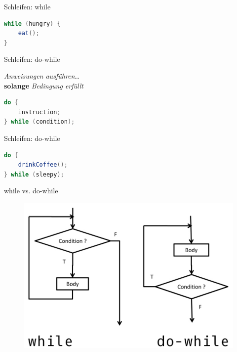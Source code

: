 \documentclass[18pt]{beamer}
\begin{document}
\begin{frame}[fragile]{Schleifen: while}
    \begin{exampleblock}{}
    \begin{lstlisting}[language=Java]
while (hungry) {
    eat();
}
    \end{lstlisting}
    \end{exampleblock}
\end{frame}

\begin{frame}[fragile]{Schleifen: do-while}
    \begin{block}{}
        \textit{Anweisungen ausführen}\dots\\
        \textbf{solange} \textit{Bedingung erfüllt}
    \end{block}
    \pause

    \begin{block}{}
        \begin{lstlisting}[language=Java]
do {
    instruction;
} while (condition);
        \end{lstlisting}
    \end{block}
\end{frame}

\begin{frame}[fragile]{Schleifen: do-while}
    \begin{exampleblock}{}
    \begin{lstlisting}[language=Java]
do {
    drinkCoffee();
} while (sleepy);
    \end{lstlisting}
    \end{exampleblock}
\end{frame}

\begin{frame}{while vs. do-while}
    \begin{figure}
        \includegraphics{img/while_vs_dowhile.jpg}
    \end{figure}
\end{frame}
\end{document}
